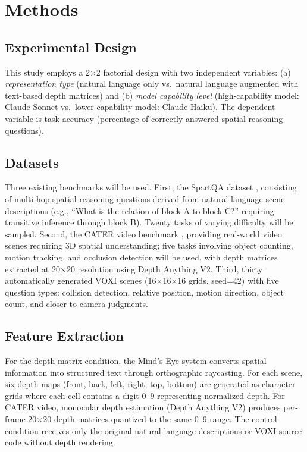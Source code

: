 \documentclass[stu,12pt,a4paper,floatsintext]{apa7}
\begin{document}
\section*{Methods}

\subsection*{Experimental Design}

This study employs a 2$\times$2 factorial design with two independent variables: (a) \emph{representation type} (natural language only vs.\ natural language augmented with text-based depth matrices) and (b) \emph{model capability level} (high-capability model: Claude Sonnet vs.\ lower-capability model: Claude Haiku). The dependent variable is task accuracy (percentage of correctly answered spatial reasoning questions).

\subsection*{Datasets}

Three existing benchmarks will be used. First, the SpartQA dataset \cite{mirzaee2021}, consisting of multi-hop spatial reasoning questions derived from natural language scene descriptions (e.g., ``What is the relation of block A to block C?'' requiring transitive inference through block B). Twenty tasks of varying difficulty will be sampled. Second, the CATER video benchmark \cite{girdhar2020}, providing real-world video scenes requiring 3D spatial understanding; five tasks involving object counting, motion tracking, and occlusion detection will be used, with depth matrices extracted at 20$\times$20 resolution using Depth Anything V2. Third, thirty automatically generated VOXI scenes (16$\times$16$\times$16 grids, seed=42) with five question types: collision detection, relative position, motion direction, object count, and closer-to-camera judgments.

\subsection*{Feature Extraction}

For the depth-matrix condition, the Mind's Eye system converts spatial information into structured text through orthographic raycasting. For each scene, six depth maps (front, back, left, right, top, bottom) are generated as character grids where each cell contains a digit 0--9 representing normalized depth. For CATER video, monocular depth estimation (Depth Anything V2) produces per-frame 20$\times$20 depth matrices quantized to the same 0--9 range. The control condition receives only the original natural language descriptions or VOXI source code without depth rendering.
\end{document}
